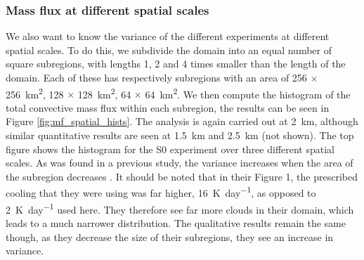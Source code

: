 \documentclass[11pt,a4paper]{article}
\newcommand\todo[1]{\textbf{TODO: #1}}
\begin{document}
%
\subsubsection{Mass flux at different spatial scales}
We also want to know the variance of the different experiments at different spatial scales. To do this, we subdivide the domain into an equal number of square subregions, with lengths 1, 2 and 4 times smaller than the length of the domain. Each of these has respectively subregions with an area of \SI{256}{} $\times$ \SI{256}{km^2}, \SI{128}{} $\times$ \SI{128}{km^2}, \SI{64}{} $\times$ \SI{64}{km^2}. We then compute the histogram of the total convective mass flux within each subregion, the results can be seen in Figure \ref{fig:mf_spatial_hists}. The analysis is again carried out at \SI{2}{km}, although similar quantitative results are seen at \SI{1.5}{km} and \SI{2.5}{km} (not shown). The top figure shows the histogram for the S0 experiment over three different spatial scales. As was found in a previous study, the variance increases when the area of the subregion decreases \parencite{PC2008}. It should be noted that in their Figure 1, the prescribed cooling that they were using was far higher, \SI{16}{K.day^{-1}}, as opposed to \SI{2}{K.day^{-1}} used here. They therefore see far more clouds in their domain, which leads to a much narrower distribution. The qualitative results remain the same though, as they decrease the size of their subregions, they see an increase in variance.
\end{document}
